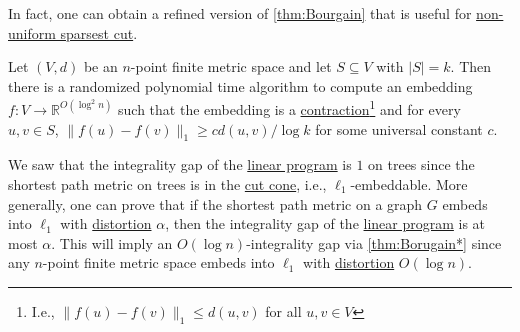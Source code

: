 In fact, one can obtain a refined version of \autoref{thm:Bourgain} that is useful for \hyperref[prb:non-uniform-sparsest-cut]{non-uniform sparsest cut}.

\begin{theorem}[Bourgain]\label{thm:Borugain*}
	Let \((V, d)\) be an \(n\)-point finite metric space and let \(S \subseteq V\) with \(\lvert S \rvert = k\). Then there is a randomized polynomial time algorithm to compute an embedding \(f \colon V \to \mathbb{R} ^{O(\log ^2 n)}\) such that the embedding is a \hyperref[def:contraction]{contraction}\footnote{I.e., \(\lVert f(u) - f(v) \rVert _1 \leq d(u, v)\) for all \(u, v \in V\)} and for every \(u, v \in S\), \(\lVert f(u) - f(v) \rVert _1 \geq c d(u, v) / \log k\) for some universal constant \(c\).
\end{theorem}

We saw that the integrality gap of the \hyperref[eq:non-uniform-sparsest-cut-LP-primal]{linear program} is \(1\) on trees since the shortest path metric on trees is in the \hyperref[def:cut-cone]{cut cone}, i.e., \(\ell _1\)-embeddable. More generally, one can prove that if the shortest path metric on a graph \(G\) embeds into \(\ell _1\) with \hyperref[def:distortion]{distortion} \(\alpha \), then the integrality gap of the \hyperref[eq:non-uniform-sparsest-cut-LP-primal]{linear program} is at most \(\alpha \). This will imply an \(O(\log n)\)-integrality gap via \autoref{thm:Borugain*} since any \(n\)-point finite metric space embeds into \(\ell _1\) with \hyperref[def:distortion]{distortion} \(O(\log n)\).

